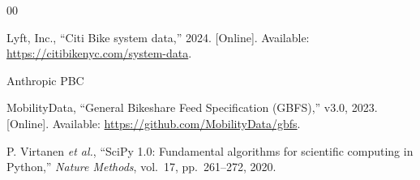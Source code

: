 \documentclass[conference]{IEEEtran}
\begin{document}
\begin{thebibliography}{00}


 Lyft, Inc., ``Citi Bike system data,'' 2024. [Online]. Available: \url{https://citibikenyc.com/system-data}.

 Anthropic PBC

 MobilityData, ``General Bikeshare Feed Specification (GBFS),'' v3.0, 2023. [Online]. Available: \url{https://github.com/MobilityData/gbfs}.








 P. Virtanen \emph{et al.}, ``SciPy 1.0: Fundamental algorithms for scientific computing in Python,'' \emph{Nature Methods}, vol.~17, pp.~261--272, 2020.

\end{thebibliography}
\end{document}
